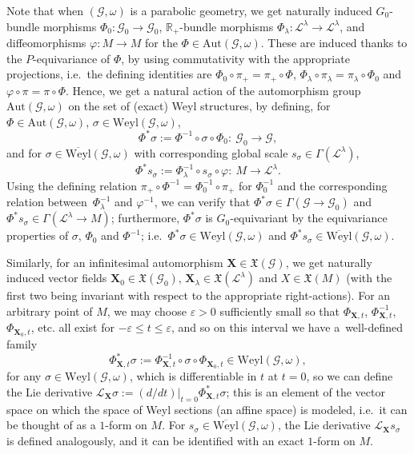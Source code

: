 \documentclass[pdftex]{sigma}
\def\R{\mathbb{R}}
\def\Gbdle{\mathcal{G}}
\def\VF{\mathfrak{X}}
\theoremstyle{plain}
\theoremstyle{definition}
\begin{document}
Note that when $(\Gbdle,\omega)$ is a parabolic geometry, we get naturally induced $G_0$-bundle morphisms $\Phi_0:\Gbdle_0 \rightarrow \Gbdle_0$, $\R_+$-bundle morphisms $\Phi_{\lambda}: \mathcal{L}^{\lambda} \rightarrow \mathcal{L}^{\lambda}$, and dif\/feomorphisms $\varphi: M \rightarrow M$ for the $\Phi \in \mathrm{Aut}(\Gbdle,\omega)$. These are induced thanks to the $P$-equivariance of $\Phi$, by using commutativity with the appropriate projections, i.e.\ the def\/ining identities are $\Phi_0 \circ \pi_+ = \pi_+ \circ \Phi$, $\Phi_{\lambda} \circ \pi_{\lambda} = \pi_{\lambda} \circ \Phi_0$  and $\varphi \circ \pi = \pi \circ \Phi$. Hence, we get a natural action of the automorphism group $\mathrm{Aut}(\Gbdle,\omega)$ on the set of (exact) Weyl structures, by def\/ining, for $\Phi \in \mathrm{Aut}(\Gbdle,\omega)$, $\sigma \in \mathrm{Weyl}(\Gbdle,\omega)$,
\[
\Phi^*\sigma := \Phi^{-1} \circ \sigma \circ \Phi_0: \ \Gbdle_0 \rightarrow \Gbdle,
\]
and for $\sigma \in \overline{\mathrm{Weyl}}(\Gbdle,\omega)$ with corresponding global scale $s_{\sigma} \in \Gamma(\mathcal{L}^{\lambda})$,
\[
\Phi^*s_{\sigma} := \Phi_{\lambda}^{-1} \circ s_{\sigma} \circ \varphi: \ M \rightarrow \mathcal{L}^{\lambda}.
\]
Using the def\/ining relation $\pi_+ \circ \Phi^{-1} = \Phi_0^{-1} \circ \pi_+$ for $\Phi_0^{-1}$ and the corresponding relation bet\-ween~$\Phi_{\lambda}^{-1}$ and $\varphi^{-1}$, we can verify that $\Phi^*\sigma \in \Gamma(\Gbdle \rightarrow \Gbdle_0)$ and $\Phi^*s_{\sigma} \in \Gamma(\mathcal{L}^{\lambda} \rightarrow M)$; furthermore, $\Phi^*\sigma$ is $G_0$-equivariant by the equivariance properties of $\sigma$, $\Phi_0$ and $\Phi^{-1}$; i.e.\ $\Phi^*\sigma \in \mathrm{Weyl}(\Gbdle,\omega)$ and $\Phi^*s_{\sigma} \in \overline{\mathrm{Weyl}}(\Gbdle,\omega)$.

Similarly, for an inf\/initesimal automorphism $\mathbf{X} \in \VF(\Gbdle)$, we get naturally induced vector f\/ields $\mathbf{X}_0 \in \VF(\Gbdle_0)$, $\mathbf{X}_{\lambda} \in \VF(\mathcal{L}^{\lambda})$ and $X \in \VF(M)$ (with the f\/irst two being invariant with respect to the appropriate right-actions). For an arbitrary point of $M$, we may choose $\varepsilon > 0$ suf\/f\/iciently small so that $\Phi_{\mathbf{X},t}$, $\Phi_{\mathbf{X},t}^{-1}$, $\Phi_{\mathbf{X}_0,t}$, etc. all exist for $-\varepsilon \leq t \leq \varepsilon$, and so on this interval we have a~well-def\/ined family
\[
\Phi_{\mathbf{X},t}^*\sigma := \Phi_{\mathbf{X},t}^{-1} \circ \sigma \circ \Phi_{\mathbf{X}_0,t} \in \mathrm{Weyl}(\Gbdle,\omega),
\]
for any $\sigma \in \mathrm{Weyl}(\Gbdle,\omega)$, which is dif\/ferentiable in $t$ at $t=0$, so we can def\/ine the Lie derivative $\mathcal{L}_{\mathbf{X}} \sigma := (d/dt)\vert_{t=0}\Phi_{\mathbf{X},t}^*\sigma$; this is an element of the vector space on which the space of Weyl sections (an af\/f\/ine space) is modeled, i.e.\ it can be thought of as a $1$-form on $M$. For $s_{\sigma} \in \overline{\mathrm{Weyl}}(\Gbdle,\omega)$, the Lie derivative $\mathcal{L}_{\mathbf{X}}s_{\sigma}$ is def\/ined analogously, and it can be identif\/ied with an exact $1$-form on $M$.
\end{document}
